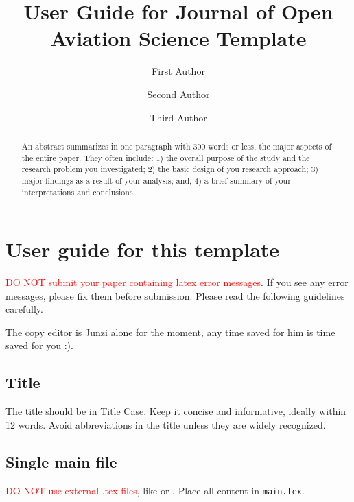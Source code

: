 \documentclass[
  manuscript=article,  %
  layout=preprint,  %
  year=20xx,
  volume=x,
]{extra/joas}
\title{User Guide for Journal of Open Aviation Science Template}
\author{First Author \orcid{0000-0000-0000-0000}}
\affiliation{Institution-1, City, Country}
\author{Second Author \orcid{0000-0000-0000-0000}}
\affiliation{Institution-2, City, Country}
\author{Third Author}
\affiliation{Institution-3, City, Country}
\begin{document}
\begin{abstract}
  An abstract summarizes in one paragraph with 300 words or less, the major aspects of the entire paper. They often include: 1) the overall purpose of the study and the research problem you investigated; 2) the basic design of you research approach; 3) major findings as a result of your analysis; and, 4) a brief summary of your interpretations and conclusions. 
\end{abstract}






\section{User guide for this template}

\textcolor{red}{DO NOT submit your paper containing latex error messages}. If you see any error messages, please fix them before submission. Please read the following guidelines carefully.

The copy editor is Junzi alone for the moment, any time saved for him is time saved for you :).

\subsection{Title}
The title should be in Title Case. Keep it concise and informative, ideally within 12 words. Avoid abbreviations in the title unless they are widely recognized.

\subsection{Single main file}
\textcolor{red}{DO NOT use external .tex files}, like \verb|| or \verb||. Place all content in \texttt{main.tex}. 
\end{document}
